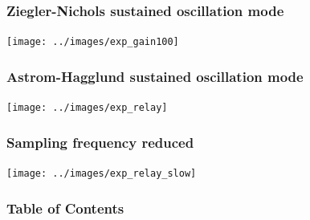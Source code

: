 \documentclass{beamer}
\begin{document}
\begin{frame}
\frametitle{Ziegler-Nichols sustained oscillation mode}
\texttt{[image: ../images/exp\_gain100]}~
\end{frame}

\begin{frame}
\frametitle{Astrom-Hagglund sustained oscillation mode}
\texttt{[image: ../images/exp\_relay]}~
\end{frame}

\begin{frame}

\frametitle{Sampling frequency reduced}
\texttt{[image: ../images/exp\_relay\_slow]}~
\end{frame}

\begin{frame}
\frametitle{Table of Contents}
\tableofcontents
\end{frame}
\end{document}
